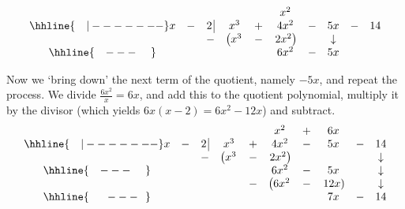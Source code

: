 \begin{ex}
\begin{enumerate}
\[\begin{array}{cccccccccc}
& & & & & x^2 & & &  &  \\ \hhline{~~~|-------}

x & - & 2 \, \vline& x^3 & + & 4x^2 & - & 5x & - & 14 \\

 &  &  -& \left(x^3 \right. & - & \left.  2x^2\right) &  & \downarrow &  &  \\ \hhline{~~~---~~~~} 
 &  &  &   &  & 6 x^2 & - & 5x &  &  \\ 
 
\end{array}\]

\setlength\arraycolsep{5pt}
\setlength\extrarowheight{0pt} 

Now we `bring down' the next term of the quotient, namely $-5x$, and repeat the process. We divide $\frac{6x^2}{x} = 6x$, and add this to the quotient polynomial, multiply it by the divisor (which yields $6x(x - 2) = 6x^{2} - 12x$) and subtract. \setlength\arraycolsep{0.1pt}\setlength\extrarowheight{2pt}\[ \begin{array}{cccccccccc}

& & & & & x^2 & + & 6x &  &  \\ \hhline{~~~|-------}

x & - & 2 \, \vline& x^3 & + & 4x^2 & - & 5x & - & 14 \\

 &  &  -& \left(x^3 \right. & - & \left.  2x^2\right) &  & &  & \downarrow  \\ \hhline{~~~---~~~~} 
 &  &  &   &  & 6 x^2 & - & 5x &  &  \downarrow \\ 
 &  &  &   & - & \left(6 x^2 \right. & - & \left. 12x \right) &  & \downarrow \\ \hhline{~~~~~---~~} 
 &  &  &   &   &  & & 7x  & - & 14 \\
 
\end{array}\]

\setlength\arraycolsep{5pt}
\setlength\extrarowheight{0pt}


\end{enumerate}
\end{ex}
